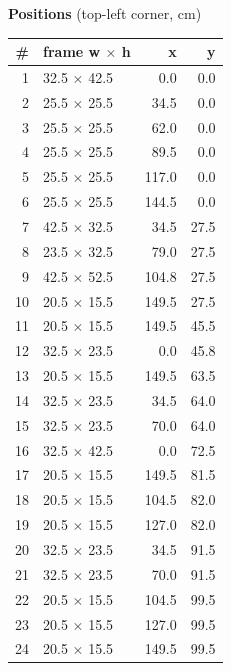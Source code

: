 \documentclass[a4paper,landscape,10pt]{article}
\begin{document}
\begin{minipage}[t]{0.25\textwidth}
\vspace{8pt}
{\bfseries Positions} (top-left corner, cm)\\[2pt]
\tiny
\begin{tabular}{@{}r l r r@{}}
\toprule
\# & frame w $\times$ h & x & y \\
\midrule
1 & 32.5 $\times$ 42.5 & 0.0 & 0.0 \\
2 & 25.5 $\times$ 25.5 & 34.5 & 0.0 \\
3 & 25.5 $\times$ 25.5 & 62.0 & 0.0 \\
4 & 25.5 $\times$ 25.5 & 89.5 & 0.0 \\
5 & 25.5 $\times$ 25.5 & 117.0 & 0.0 \\
6 & 25.5 $\times$ 25.5 & 144.5 & 0.0 \\
7 & 42.5 $\times$ 32.5 & 34.5 & 27.5 \\
8 & 23.5 $\times$ 32.5 & 79.0 & 27.5 \\
9 & 42.5 $\times$ 52.5 & 104.8 & 27.5 \\
10 & 20.5 $\times$ 15.5 & 149.5 & 27.5 \\
11 & 20.5 $\times$ 15.5 & 149.5 & 45.5 \\
12 & 32.5 $\times$ 23.5 & 0.0 & 45.8 \\
13 & 20.5 $\times$ 15.5 & 149.5 & 63.5 \\
14 & 32.5 $\times$ 23.5 & 34.5 & 64.0 \\
15 & 32.5 $\times$ 23.5 & 70.0 & 64.0 \\
16 & 32.5 $\times$ 42.5 & 0.0 & 72.5 \\
17 & 20.5 $\times$ 15.5 & 149.5 & 81.5 \\
18 & 20.5 $\times$ 15.5 & 104.5 & 82.0 \\
19 & 20.5 $\times$ 15.5 & 127.0 & 82.0 \\
20 & 32.5 $\times$ 23.5 & 34.5 & 91.5 \\
21 & 32.5 $\times$ 23.5 & 70.0 & 91.5 \\
22 & 20.5 $\times$ 15.5 & 104.5 & 99.5 \\
23 & 20.5 $\times$ 15.5 & 127.0 & 99.5 \\
24 & 20.5 $\times$ 15.5 & 149.5 & 99.5 \\
\bottomrule
\end{tabular}
\end{minipage}
\clearpage
\end{document}
